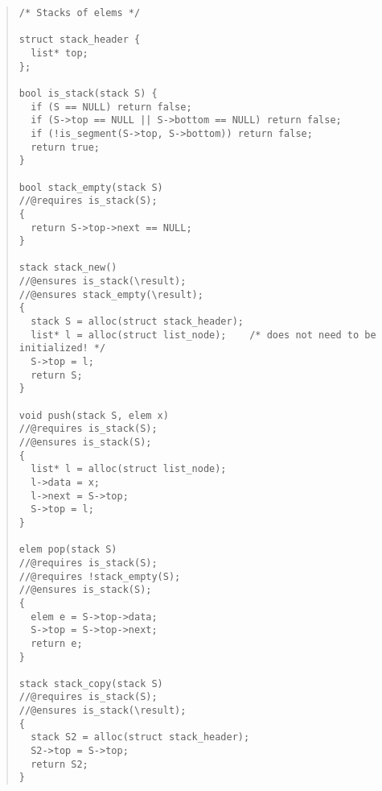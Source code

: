 \documentclass[]{article}
\begin{document}
\begin{enumerate}
\begin{quote}
\begin{verbatim}
/* Stacks of elems */

struct stack_header {
  list* top;
};

bool is_stack(stack S) {
  if (S == NULL) return false;
  if (S->top == NULL || S->bottom == NULL) return false;
  if (!is_segment(S->top, S->bottom)) return false;
  return true;
}

bool stack_empty(stack S)
//@requires is_stack(S);
{
  return S->top->next == NULL;
}

stack stack_new()
//@ensures is_stack(\result);
//@ensures stack_empty(\result);
{
  stack S = alloc(struct stack_header);
  list* l = alloc(struct list_node);	/* does not need to be initialized! */
  S->top = l;
  return S;
}

void push(stack S, elem x)
//@requires is_stack(S);
//@ensures is_stack(S);
{
  list* l = alloc(struct list_node);
  l->data = x;
  l->next = S->top;
  S->top = l;
}

elem pop(stack S)
//@requires is_stack(S);
//@requires !stack_empty(S);
//@ensures is_stack(S);
{
  elem e = S->top->data;
  S->top = S->top->next;
  return e;
}

stack stack_copy(stack S) 
//@requires is_stack(S);
//@ensures is_stack(\result);
{
  stack S2 = alloc(struct stack_header);
  S2->top = S->top;
  return S2;
}
\end{verbatim}
  \end{quote}
\end{enumerate}
\end{document}

